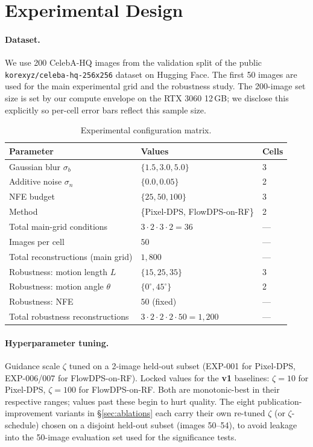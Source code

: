 \documentclass{article}
\begin{document}
\section{Experimental Design}\label{sec:expdesign}

\paragraph{Dataset.}
We use 200 CelebA-HQ images from the validation split of the public
\texttt{korexyz/celeba-hq-256x256} dataset on Hugging Face. The first
50 images are used for the main experimental grid and the robustness
study. The 200-image set size is set by our compute envelope on the
RTX 3060 12\,GB; we disclose this explicitly so per-cell error bars
reflect this sample size.

\begin{table}[h]
  \centering
  \caption{Experimental configuration matrix.}
  \label{tab:config}
  \begin{tabular}{lll}
    \toprule
    Parameter & Values & Cells \\
    \midrule
    Gaussian blur $\sigma_b$ & $\{1.5, 3.0, 5.0\}$ & 3 \\
    Additive noise $\sigma_n$ & $\{0.0, 0.05\}$ & 2 \\
    NFE budget & $\{25, 50, 100\}$ & 3 \\
    Method & \{Pixel-DPS, FlowDPS-on-RF\} & 2 \\
    \midrule
    Total main-grid conditions & $3 \cdot 2 \cdot 3 \cdot 2 = 36$ & — \\
    Images per cell & $50$ & — \\
    Total reconstructions (main grid) & $1{,}800$ & — \\
    \midrule
    Robustness: motion length $L$ & $\{15, 25, 35\}$ & 3 \\
    Robustness: motion angle $\theta$ & $\{0^\circ, 45^\circ\}$ & 2 \\
    Robustness: NFE & $50$ (fixed) & — \\
    Total robustness reconstructions & $3 \cdot 2 \cdot 2 \cdot 2 \cdot 50 = 1{,}200$ & — \\
    \bottomrule
  \end{tabular}
\end{table}

\paragraph{Hyperparameter tuning.}
Guidance scale $\zeta$ tuned on a 2-image held-out subset (EXP-001 for
Pixel-DPS, EXP-006/007 for FlowDPS-on-RF). Locked values for the
\textbf{v1} baselines: $\zeta = 10$ for Pixel-DPS, $\zeta = 100$ for
FlowDPS-on-RF. Both are monotonic-best in their respective ranges;
values past these begin to hurt quality. The eight
publication-improvement variants in \S\ref{sec:ablations} each carry
their own re-tuned $\zeta$ (or $\zeta$-schedule) chosen on a disjoint
held-out subset (images 50--54), to avoid leakage into the
50-image evaluation set used for the significance tests.
\end{document}
